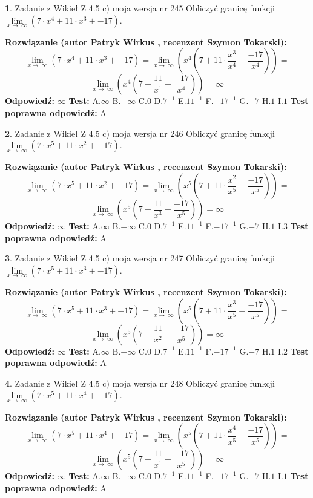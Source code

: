 \documentclass[12pt, a4paper]{article}
\theoremstyle{definition} %
\newtheorem{zad}{}
\newcommand{\zadStart}[1]{\begin{zad}#1\newline}
\newcommand{\zadStop}{\end{zad}}
\newcommand{\rozwStart}[2]{\noindent \textbf{Rozwiązanie (autor #1 , recenzent #2): }\newline}
\newcommand{\rozwStop}{\newline}
\newcommand{\odpStart}{\noindent \textbf{Odpowiedź:}\newline}
\newcommand{\odpStop}{\newline}
\newcommand{\testStart}{\noindent \textbf{Test:}\newline}
\newcommand{\testStop}{\newline}
\newcommand{\kluczStart}{\noindent \textbf{Test poprawna odpowiedź:}\newline}
\newcommand{\kluczStop}{\newline}
\begin{document}
\zadStart{Zadanie z Wikieł Z 4.5 c) moja wersja nr 245}
Obliczyć granicę funkcji  $\lim\limits_{x\to\ \infty}(7 \cdot x^{4}+11 \cdot x^{3}+-17)$.
\zadStop
\rozwStart{Patryk Wirkus}{Szymon Tokarski}
$$\lim\limits_{x\to\ \infty}(7 \cdot x^{4}+11 \cdot x^{3}+-17) = \lim\limits_{x\to\ \infty}(x^{4}(7 +11 \cdot \frac{x^{3}}{x^{4}}+\frac{-17}{x^{4}})) =$$ $$\lim\limits_{x\to\ \infty}(x^{4}(7 +\frac{11}{x^{1}}+\frac{-17}{x^{4}})) =\infty$$
\rozwStop
\odpStart
$\infty$
\odpStop
\testStart
A.$\infty$ B.$-\infty$ C.$0$ D.$7^{-1}$ E.$11^{-1}$
F.$-17^{-1}$ G.$-7$
H.$1$
I.$1$
\testStop
\kluczStart
A
\kluczStop



\zadStart{Zadanie z Wikieł Z 4.5 c) moja wersja nr 246}
Obliczyć granicę funkcji  $\lim\limits_{x\to\ \infty}(7 \cdot x^{5}+11 \cdot x^{2}+-17)$.
\zadStop
\rozwStart{Patryk Wirkus}{Szymon Tokarski}
$$\lim\limits_{x\to\ \infty}(7 \cdot x^{5}+11 \cdot x^{2}+-17) = \lim\limits_{x\to\ \infty}(x^{5}(7 +11 \cdot \frac{x^{2}}{x^{5}}+\frac{-17}{x^{5}})) =$$ $$\lim\limits_{x\to\ \infty}(x^{5}(7 +\frac{11}{x^{3}}+\frac{-17}{x^{5}})) =\infty$$
\rozwStop
\odpStart
$\infty$
\odpStop
\testStart
A.$\infty$ B.$-\infty$ C.$0$ D.$7^{-1}$ E.$11^{-1}$
F.$-17^{-1}$ G.$-7$
H.$1$
I.$3$
\testStop
\kluczStart
A
\kluczStop



\zadStart{Zadanie z Wikieł Z 4.5 c) moja wersja nr 247}
Obliczyć granicę funkcji  $\lim\limits_{x\to\ \infty}(7 \cdot x^{5}+11 \cdot x^{3}+-17)$.
\zadStop
\rozwStart{Patryk Wirkus}{Szymon Tokarski}
$$\lim\limits_{x\to\ \infty}(7 \cdot x^{5}+11 \cdot x^{3}+-17) = \lim\limits_{x\to\ \infty}(x^{5}(7 +11 \cdot \frac{x^{3}}{x^{5}}+\frac{-17}{x^{5}})) =$$ $$\lim\limits_{x\to\ \infty}(x^{5}(7 +\frac{11}{x^{2}}+\frac{-17}{x^{5}})) =\infty$$
\rozwStop
\odpStart
$\infty$
\odpStop
\testStart
A.$\infty$ B.$-\infty$ C.$0$ D.$7^{-1}$ E.$11^{-1}$
F.$-17^{-1}$ G.$-7$
H.$1$
I.$2$
\testStop
\kluczStart
A
\kluczStop



\zadStart{Zadanie z Wikieł Z 4.5 c) moja wersja nr 248}
Obliczyć granicę funkcji  $\lim\limits_{x\to\ \infty}(7 \cdot x^{5}+11 \cdot x^{4}+-17)$.
\zadStop
\rozwStart{Patryk Wirkus}{Szymon Tokarski}
$$\lim\limits_{x\to\ \infty}(7 \cdot x^{5}+11 \cdot x^{4}+-17) = \lim\limits_{x\to\ \infty}(x^{5}(7 +11 \cdot \frac{x^{4}}{x^{5}}+\frac{-17}{x^{5}})) =$$ $$\lim\limits_{x\to\ \infty}(x^{5}(7 +\frac{11}{x^{1}}+\frac{-17}{x^{5}})) =\infty$$
\rozwStop
\odpStart
$\infty$
\odpStop
\testStart
A.$\infty$ B.$-\infty$ C.$0$ D.$7^{-1}$ E.$11^{-1}$
F.$-17^{-1}$ G.$-7$
H.$1$
I.$1$
\testStop
\kluczStart
A
\kluczStop
\end{document}
